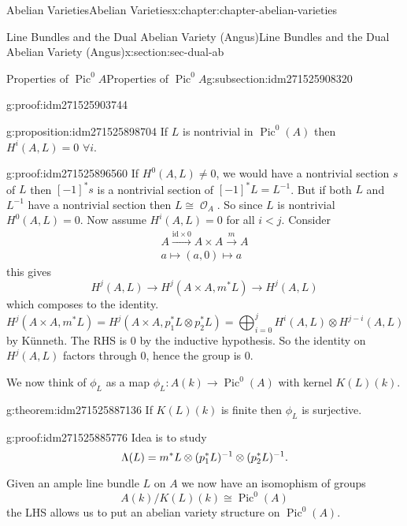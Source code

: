 \documentclass[oneside,10pt,]{book}
\newcommand{\qedhere}{\relax}
\numberwithin{equation}{section}
\newcommand{\sheaf}[1]{\operatorname{\mathcal{#1}}}
\newcommand{\lb}{[}
\newcommand{\rb}{]}
\newcommand{\id}{\mathrm{id}}
\DeclareMathOperator{\Pic}{Pic}
\newcommand{\lt}{<}
\begin{document}
\begin{chapterptx}{Abelian Varieties}{}{Abelian Varieties}{}{}{x:chapter:chapter-abelian-varieties}
\begin{sectionptx}{Line Bundles and the Dual Abelian Variety (Angus)}{}{Line Bundles and the Dual Abelian Variety (Angus)}{}{}{x:section:sec-dual-ab}
\begin{subsectionptx}{Properties of \(\Pic^0 A\)}{}{Properties of \(\Pic^0 A\)}{}{}{g:subsection:idm271525908320}
\begin{proofptx}{}{g:proof:idm271525903744}
\end{proofptx}
\begin{proposition}{}{}{g:proposition:idm271525898704}%
If \(L\) is nontrivial in \(\Pic^0(A)\) then \(H^i(A,L) = 0\) \(\forall i\).%
\end{proposition}
\begin{proofptx}{}{g:proof:idm271525896560}
If \(H^0(A,L) \ne 0\), we would have  a nontrivial section \(s\) of \(L\) then \(\lb -1\rb ^* s\) is   a nontrivial section of \(\lb-1\rb^* L = L^{-1}\). But if both \(L\) and \(L^{-1}\) have  a nontrivial section then \(L \cong \sheaf O_A\). So since \(L\) is nontrivial \(H^0(A,L) = 0\). Now assume \(H^i(A,L) = 0\) for all \(i\lt j\). Consider%
\begin{gather*}
A\xrightarrow{\id \times 0} A\times A \xrightarrow m A\\
a\mapsto (a,0)\mapsto a
\end{gather*}
this gives%
\begin{equation*}
H^j(A, L) \to H^j(A\times A, m^*L) \to H^j(A,L)
\end{equation*}
which composes to the identity.%
\begin{equation*}
H^j(A\times A, m^*L) =  H^j(A\times A, p_1^*L \otimes p_2^*L) = \bigoplus_{i=0}^j H^i(A,L) \otimes H^{j-i}(A,L)
\end{equation*}
by Künneth. The RHS is 0 by the inductive hypothesis. So the identity on \(H^j(A,L)\) factors through 0, hence the group is 0.%
\end{proofptx}
We now think of \(\phi_L\) as a map \(\phi_L \colon A(k) \to \Pic^0(A)\) with kernel \(K(L) (k)\).%
\begin{theorem}{}{}{g:theorem:idm271525887136}%
If \(K(L)(k)\) is finite then \(\phi_L\) is surjective.%
\end{theorem}
\begin{proofptx}{}{g:proof:idm271525885776}
Idea is to study%
\begin{equation*}
\Lambda (L) =  m^* L \otimes (p_1^* L)^{-1} \otimes (p_2^* L)^{-1}\text{.}\qedhere
\end{equation*}
%
\end{proofptx}
Given an ample line bundle \(L\) on \(A\) we now have an isomophism of groups%
\begin{equation*}
A(k)/K(L)(k) \cong \Pic^0(A)
\end{equation*}
the LHS allows us to put an abelian variety structure on \(\Pic^0(A)\).%
\end{subsectionptx}
%
%
\typeout{************************************************}

\end{sectionptx}
\end{chapterptx}
\end{document}
